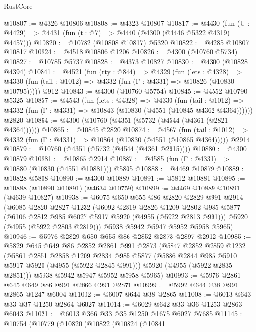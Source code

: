 \begin{lexlean}{RustCore}
\begin{coremodule}
@10807 := @4326 @10806
@10808 := @4323 @10807
@10817 := @4430 (fun (U : @4429) => @4431 (fun (t : @7) => @4440 (@4300 (@4446 @5322 @4319) @4457)))
@10820 := @10782 (@10808 @10817) @5320
@10822 := @4285 @10807 @10817
@10824 := @4518 @10806 @1206
@10826 := @4300 (@10760 @5734)
@10827 := @10785 @5737
@10828 := @4373 @10827
@10830 := @4300 (@10828 @4394)
@10841 := @4521
    (fun (rty : @844) =>
    @4329
      (fun (lets : @4328) =>
      @4330 (fun (tail : @1012) => @4332 (fun (Γ : @4331) => @10826 (@10830 @10795)))))
    @912
@10843 := @4300 (@10760 @5754)
@10845 := @4552 @10790 @5325
@10857 := @4543
    (fun (lets : @4328) =>
    @4330
      (fun (tail : @1012) =>
      @4332 (fun (Γ : @4331) => @10843 (@10830 (@4551 (@10845 @4362 @4364))))))
    @2820
@10864 := @4300 (@10760 (@4351 (@5732 (@4544 (@4361 (@2821 @4364))))))
@10865 := @10845 @2820
@10874 := @4567
    (fun (tail : @1012) => @4332 (fun (Γ : @4331) => @10864 (@10830 (@4551 (@10865 @4364)))))
    @2914
@10879 := @10760 (@4351 (@5732 (@4544 (@4361 @2915))))
@10880 := @4300 @10879
@10881 := @10865 @2914
@10887 := @4585 (fun (Γ : @4331) => @10880 (@10830 (@4551 @10881))) @5805
@10888 := @4469 @10879
@10889 := @10828 @5808
@10890 := @4300 @10889
@10891 := @5812 @10881
@10895 := @10888 (@10890 @10891) (@4634 @10759)
@10899 := @4469 @10889 @10891 (@4639 @10827)
@10938 := @6075
    @650
    @655
    @86
    @2820
    @2829
    @991
    @2914
    (@6085
      @2820
      @2827
      @1232
      (@6092
        @2819
        @2826
        @1209
        @2802
        @985
        @5877
        (@6106 @2812 @985 @6027 @5917 @5920 (@4955 (@5922 @2813 @991)))
        @5920
        (@4955 (@5922 @2803 @2819)))
      @5938
      @5942
      @5947
      @5952
      @5958
      @5965)
@10946 := @5976 @2829 @650 @655 @86 @2852 @2873 @2897 @2912
@10985 := @5829
    @645
    @649
    @86
    @2852
    @2861
    @991
    @2873
    (@5847
      @2852
      @2859
      @1232
      (@5861
        @2851
        @2858
        @1209
        @2834
        @985
        @5877
        (@5886 @2844 @985 @5910 @5917 @5920 (@4955 (@5922 @2845 @991)))
        @5920
        (@4955 (@5922 @2835 @2851)))
      @5938
      @5942
      @5947
      @5952
      @5958
      @5965)
@10993 := @5976 @2861 @645 @649 @86 @991 @2866 @991 @2871
@10999 := @5992 @644 @38 @991 @2865 @1247 @6004
@11002 := @6007 @644 @38 @2865
@11008 := @6013 @643 @33 @37 @1250 @2864 @6027
@11014 := @6029 @642 @33 @36 @1253 @2863 @6043
@11021 := @6013 @366 @33 @35 @1250 @1675 @6027 @7685
@11145 := @10754
    (@10779
      (@10820
        (@10822
          (@10824
            (@10841

\end{coremodule}
\end{lexlean}
